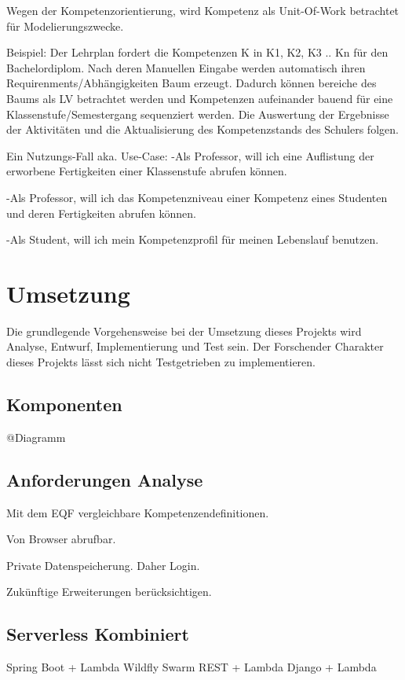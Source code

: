 \documentclass[
12pt,
english,
ngerman,
headsepline,
twoside,
openright,
numbers=noenddot,version=first
]{scrreprt}
\begin{document}
Wegen der Kompetenzorientierung, wird Kompetenz als Unit-Of-Work betrachtet für Modelierungszwecke.

Beispiel:
Der Lehrplan fordert die Kompetenzen K in K1, K2, K3 .. Kn für den Bachelordiplom. Nach deren Manuellen Eingabe werden automatisch
ihren Requirenments/Abhängigkeiten Baum erzeugt. Dadurch können bereiche des Baums als LV betrachtet werden und Kompetenzen aufeinander
bauend für eine Klassenstufe/Semestergang sequenziert werden. Die Auswertung der Ergebnisse der Aktivitäten und die Aktualisierung des Kompetenzstands
des Schulers folgen.

Ein Nutzungs-Fall aka. Use-Case: 
-Als Professor, will ich eine Auflistung der erworbene Fertigkeiten einer Klassenstufe abrufen können.

-Als Professor, will ich das Kompetenzniveau einer Kompetenz eines Studenten und deren Fertigkeiten abrufen können.

-Als Student, will ich mein Kompetenzprofil für meinen Lebenslauf benutzen.

\chapter{Umsetzung}
Die grundlegende Vorgehensweise bei der Umsetzung dieses Projekts wird Analyse, Entwurf, Implementierung und Test sein. Der Forschender Charakter dieses Projekts lässt sich nicht Testgetrieben zu implementieren. 

\section{Komponenten}

@Diagramm

\section{Anforderungen Analyse}
Mit dem EQF vergleichbare Kompetenzendefinitionen.

Von Browser abrufbar. 

Private Datenspeicherung. Daher Login.

Zukünftige Erweiterungen berücksichtigen.

\section{Serverless Kombiniert}
Spring Boot + Lambda
Wildfly Swarm REST + Lambda
Django + Lambda
\end{document}
